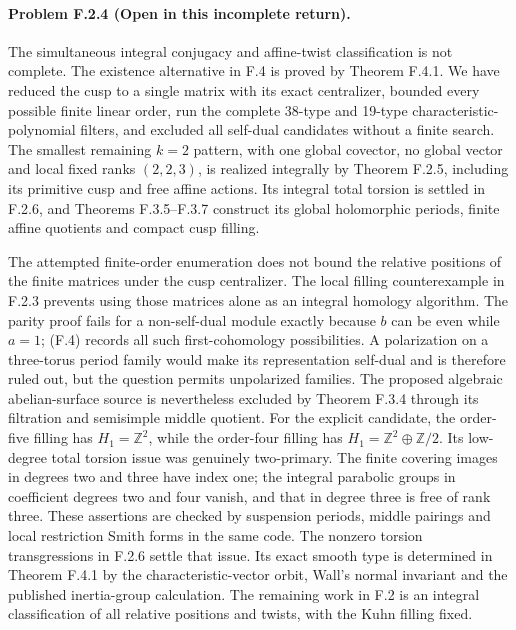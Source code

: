 \paragraph{Problem F.2.4 (Open in this incomplete return).}
The simultaneous integral conjugacy and affine-twist
classification is not complete.
The existence alternative in F.4 is proved by Theorem F.4.1.
We have reduced the cusp
to a single matrix with its exact centralizer, bounded every
possible finite linear order, run the complete 38-type and
19-type characteristic-polynomial filters, and excluded all
self-dual candidates without a finite search.  The smallest
remaining $k=2$ pattern, with one global covector, no global vector
and local fixed ranks $(2,2,3)$, is realized integrally by
Theorem F.2.5, including its primitive cusp and free affine actions.
Its integral total torsion is settled in F.2.6, and
Theorems F.3.5--F.3.7 construct its global holomorphic periods,
finite affine quotients and compact cusp filling.

The attempted finite-order enumeration does not bound the
relative positions of the finite matrices under the cusp
centralizer.  The local filling counterexample in F.2.3
prevents using those matrices alone as an integral homology
algorithm.  The parity proof fails for a non-self-dual module
exactly because $b$ can be even while $a=1$; (F.4) records all
such first-cohomology possibilities.  A polarization on a
three-torus period family would make its representation
self-dual and is therefore ruled out, but the question permits
unpolarized families.  The proposed algebraic abelian-surface
source is nevertheless excluded by Theorem F.3.4 through its
filtration and semisimple middle quotient.
For the explicit candidate, the order-five filling has
$H_1=\mathbb Z^2$, while the order-four filling has
$H_1=\mathbb Z^2\oplus\mathbb Z/2$.
Its low-degree total torsion issue was genuinely two-primary.
The finite covering images in degrees two and three have index
one; the integral parabolic groups in coefficient degrees two
and four vanish, and that in degree three is free of rank three.
These assertions are checked by suspension periods, middle
pairings and local restriction Smith forms in the same code.
The nonzero torsion transgressions in F.2.6 settle that issue.
Its exact smooth type is determined in Theorem F.4.1 by the
characteristic-vector orbit, Wall's normal invariant and the
published inertia-group calculation.  The remaining work in F.2
is an integral classification of all relative positions and twists,
with the Kuhn filling fixed.

